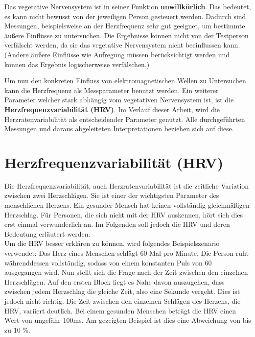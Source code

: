 Das vegetative Nervensystem ist in seiner Funktion \textbf{unwillkürlich}. Das bedeutet, es kann nicht bewusst von der jeweiligen Person gesteuert werden. Dadurch sind Messungen, beispielsweise an der Herzfrequenz sehr gut geeignet, um bestimmte äußere Einflüsse zu untersuchen.
Die Ergebnisse können nicht von der Testperson verfälscht werden, da sie das vegetative Nervensystem nicht beeinflussen kann. (Andere äußere Einflüsse wie Aufregung müssen berücksichtigt werden und können das Ergebnis logischerweise verfälschen.)
		
\color{red} Um nun den konkreten Einfluss von elektromagnetischen Wellen zu Untersuchen kann die Herzfrequenz als Messparameter benutzt werden. Ein weiterer Parameter welcher stark abhängig vom vegetativen Nervensystem ist, ist die \textbf{Herzfrequenzvariabilität (HRV)}. Im Verlauf dieser Arbeit, wird die Herzratenvariabilität als entscheidender Parameter genutzt. Alle durchgeführten Messungen und daraus abgeleiteten Interpretationen beziehen sich auf diese. 
\color{black}

\section{Herzfrequenzvariabilität (HRV)}
Die Herzfrequenzvariabilität, auch Herzratenvariabilität ist die zeitliche Variation zwischen zwei Herzschlägen. Sie ist einer der wichtigsten Parameter des menschlichen Herzens. Ein gesunder Mensch hat keinen vollständig gleichmäßigen Herzschlag. Für Personen, die sich nicht mit der HRV auskennen, hört sich dies erst einmal verwunderlich an. Im Folgenden soll jedoch die HRV und deren Bedeutung erläutert werden. \\
Um die HRV besser erklären zu können, wird folgendes Beispielszenario verwendet: Das Herz eines Menschen schlägt 60 Mal pro Minute. Die Person ruht währenddessen vollständig, sodass von einem konstanten Puls von 60 ausgegangen wird. Nun stellt sich die Frage nach der Zeit zwischen den einzelnen Herzschlägen. Auf den ersten Block liegt es Nahe davon auszugehen, dass zwischen jedem Herzschlag die gleiche Zeit, also eine Sekunde vergeht. Dies ist jedoch nicht richtig. Die Zeit zwischen den einzelnen Schlägen des Herzens, die HRV,  variiert deutlich.  Bei einem gesunden Menschen beträgt die HRV einen Wert von ungefähr 100ms. Am gezeigten Beispiel ist dies eine Abweichung von bis zu 10 \%. \\

